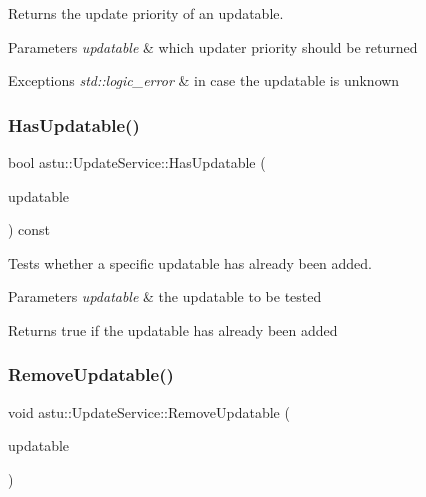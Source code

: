 Returns the update priority of an updatable.


\begin{DoxyParams}{Parameters}
{\em updatable} & which updater priority should be returned \\
\hline
\end{DoxyParams}

\begin{DoxyExceptions}{Exceptions}
{\em std\+::logic\+\_\+error} & in case the updatable is unknown \\
\hline
\end{DoxyExceptions}
\mbox{\label{classastu_1_1UpdateService_ab76b0993cefac357bc37e690c75bfdee}} 
\subsubsection{\texorpdfstring{Has\+Updatable()}{HasUpdatable()}}
{\footnotesize\ttfamily bool astu\+::\+Update\+Service\+::\+Has\+Updatable (\begin{DoxyParamCaption}\item[{\hyperlink{classastu_1_1IUpdatable}{I\+Updatable} \&}]{updatable }\end{DoxyParamCaption}) const}

Tests whether a specific updatable has already been added.


\begin{DoxyParams}{Parameters}
{\em updatable} & the updatable to be tested \\
\hline
\end{DoxyParams}
\begin{DoxyReturn}{Returns}
{\ttfamily true} if the updatable has already been added 
\end{DoxyReturn}
\mbox{\label{classastu_1_1UpdateService_aa861a19c8b3fe72b45b8f886f3d945db}} 
\subsubsection{\texorpdfstring{Remove\+Updatable()}{RemoveUpdatable()}}
{\footnotesize\ttfamily void astu\+::\+Update\+Service\+::\+Remove\+Updatable (\begin{DoxyParamCaption}\item[{\hyperlink{classastu_1_1IUpdatable}{I\+Updatable} \&}]{updatable }\end{DoxyParamCaption})}

